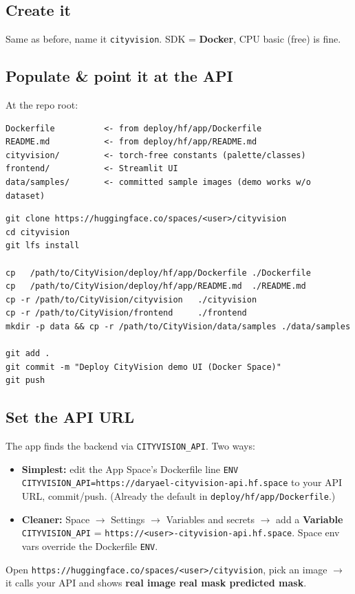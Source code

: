 \documentclass[11pt]{article}
\newcommand{\code}[1]{\lstinline[basicstyle=\ttfamily\normalsize]|#1|}
\newcommand{\rarr}{$\rightarrow$}
\begin{document}
\subsection{Create it}
Same as before, name it \code{cityvision}. SDK = \textbf{Docker}, CPU basic (free) is
fine.

\subsection{Populate \& point it at the API}
At the repo root:
\begin{lstlisting}[style=block]
Dockerfile          <- from deploy/hf/app/Dockerfile
README.md           <- from deploy/hf/app/README.md
cityvision/         <- torch-free constants (palette/classes)
frontend/           <- Streamlit UI
data/samples/       <- committed sample images (demo works w/o dataset)
\end{lstlisting}
\begin{lstlisting}[style=block]
git clone https://huggingface.co/spaces/<user>/cityvision
cd cityvision
git lfs install

cp   /path/to/CityVision/deploy/hf/app/Dockerfile ./Dockerfile
cp   /path/to/CityVision/deploy/hf/app/README.md  ./README.md
cp -r /path/to/CityVision/cityvision   ./cityvision
cp -r /path/to/CityVision/frontend     ./frontend
mkdir -p data && cp -r /path/to/CityVision/data/samples ./data/samples

git add .
git commit -m "Deploy CityVision demo UI (Docker Space)"
git push
\end{lstlisting}

\subsection{Set the API URL}
The app finds the backend via \code{CITYVISION_API}. Two ways:
\begin{itemize}
  \item \textbf{Simplest:} edit the App Space's Dockerfile line
    \code{ENV CITYVISION_API=https://daryael-cityvision-api.hf.space} to your API
    URL, commit/push. (Already the default in \code{deploy/hf/app/Dockerfile}.)
  \item \textbf{Cleaner:} Space \rarr{} Settings \rarr{} Variables and secrets \rarr{}
    add a \textbf{Variable} \code{CITYVISION_API} =
    \code{https://<user>-cityvision-api.hf.space}. Space env vars override the
    Dockerfile \code{ENV}.
\end{itemize}
Open \code{https://huggingface.co/spaces/<user>/cityvision}, pick an image \rarr{} it
calls your API and shows \textbf{real image \textperiodcentered{} real mask
\textperiodcentered{} predicted mask}.
\end{document}
